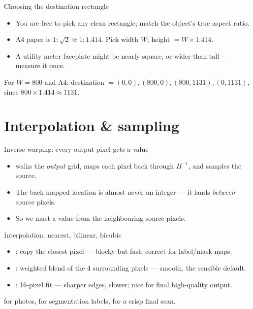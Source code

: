 \documentclass[10pt,aspectratio=169]{beamer}
\begin{document}
\begin{frame}{Choosing the destination rectangle}
  \begin{itemize}
    \item You are free to pick any clean rectangle; match the object's true aspect ratio.
    \item A4 paper is $1:\sqrt{2}\approx1{:}1.414$. Pick width $W$; height $=W\times1.414$.
    \item A utility meter faceplate might be nearly square, or wider than tall — measure it once.
  \end{itemize}
  \begin{mathbox}
    For $W=800$ and A4: destination $=(0,0),(800,0),(800,1131),(0,1131)$, since $800\times1.414\approx1131$.
  \end{mathbox}
\end{frame}

\section{Interpolation \& sampling}

\begin{frame}{Inverse warping: every output pixel gets a value}
  \begin{itemize}
    \item {} walks the \emph{output} grid, maps each pixel back through $H^{-1}$, and samples the source.
    \item The back-mapped location is almost never an integer — it lands \emph{between} source pixels.
    \item So we must  a value from the neighbouring source pixels.
  \end{itemize}
\end{frame}

\begin{frame}{Interpolation: nearest, bilinear, bicubic}
  \begin{itemize}
    \item {}: copy the closest pixel — blocky but fast; correct for label/mask maps.
    \item {}: weighted blend of the 4 surrounding pixels — smooth, the sensible default.
    \item {}: 16-pixel fit — sharper edges, slower; nice for final high-quality output.
  \end{itemize}
  \begin{infobox}
     for photos,  for segmentation labels,  for a crisp final scan.
  \end{infobox}
\end{frame}
\end{document}
